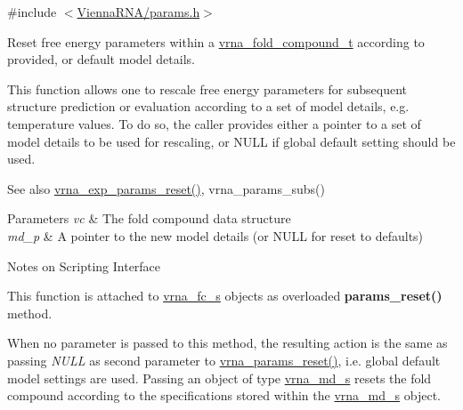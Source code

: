 {\ttfamily \#include $<$\hyperlink{params_8h}{Vienna\+R\+N\+A/params.\+h}$>$}



Reset free energy parameters within a \hyperlink{group__fold__compound_ga1b0cef17fd40466cef5968eaeeff6166}{vrna\+\_\+fold\+\_\+compound\+\_\+t} according to provided, or default model details. 

This function allows one to rescale free energy parameters for subsequent structure prediction or evaluation according to a set of model details, e.\+g. temperature values. To do so, the caller provides either a pointer to a set of model details to be used for rescaling, or N\+U\+LL if global default setting should be used.

\begin{DoxySeeAlso}{See also}
\hyperlink{group__energy__parameters_gaa5409218068be84d7b50c78fbdaa85a9}{vrna\+\_\+exp\+\_\+params\+\_\+reset()}, vrna\+\_\+params\+\_\+subs() 
\end{DoxySeeAlso}

\begin{DoxyParams}{Parameters}
{\em vc} & The fold compound data structure \\
\hline
{\em md\+\_\+p} & A pointer to the new model details (or N\+U\+LL for reset to defaults)\\
\hline
\end{DoxyParams}
\begin{DoxyRefDesc}{Notes on Scripting Interface}
\item[\hyperlink{scripting__scripting000006}{Notes on Scripting Interface}]This function is attached to \hyperlink{group__fold__compound_structvrna__fc__s}{vrna\+\_\+fc\+\_\+s} objects as overloaded {\bfseries params\+\_\+reset()} method.

When no parameter is passed to this method, the resulting action is the same as passing {\itshape N\+U\+LL} as second parameter to \hyperlink{group__energy__parameters_gac40dc82e48a72a97cfc58b9da08a7792}{vrna\+\_\+params\+\_\+reset()}, i.\+e. global default model settings are used. Passing an object of type \hyperlink{group__model__details_structvrna__md__s}{vrna\+\_\+md\+\_\+s} resets the fold compound according to the specifications stored within the \hyperlink{group__model__details_structvrna__md__s}{vrna\+\_\+md\+\_\+s} object. \end{DoxyRefDesc}
